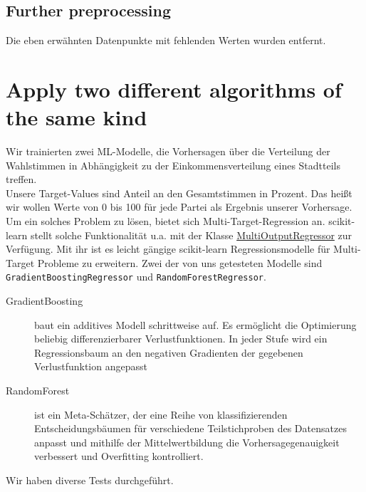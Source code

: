 \documentclass[a4paper,10pt]{scrartcl}
\begin{document}
\subsection{Further preprocessing}
Die eben erwähnten Datenpunkte mit fehlenden Werten wurden entfernt.


\section{Apply two different algorithms of the same kind}
Wir trainierten zwei ML-Modelle, die Vorhersagen über die Verteilung der Wahlstimmen in Abhängigkeit zu der Einkommensverteilung eines Stadtteils treffen.\\
Unsere Target-Values sind Anteil an den Gesamtstimmen in Prozent. Das heißt wir wollen Werte von 0 bis 100 für jede Partei als Ergebnis unserer Vorhersage. Um ein solches Problem zu lösen, bietet sich Multi-Target-Regression an. scikit-learn stellt solche Funktionalität u.a. mit der Klasse \href{https://scikit-learn.org/stable/modules/generated/sklearn.multioutput.MultiOutputRegressor.html}{MultiOutputRegressor} zur Verfügung. Mit ihr ist es leicht gängige scikit-learn Regressionsmodelle für Multi-Target Probleme zu erweitern. Zwei der von uns getesteten Modelle sind \lstinline|GradientBoostingRegressor| und \lstinline|RandomForestRegressor|.
\begin{description}
	\item[GradientBoosting] baut ein additives Modell schrittweise auf. Es ermöglicht die Optimierung beliebig differenzierbarer Verlustfunktionen. In jeder Stufe wird ein Regressionsbaum an den negativen Gradienten der gegebenen Verlustfunktion angepasst
	\item[RandomForest] ist ein Meta-Schätzer, der eine Reihe von klassifizierenden Entscheidungsbäumen für verschiedene Teilstichproben des Datensatzes anpasst und mithilfe der Mittelwertbildung die Vorhersagegenauigkeit verbessert und Overfitting kontrolliert.	 
\end{description}
 Wir haben diverse Tests durchgeführt.
\end{document}
